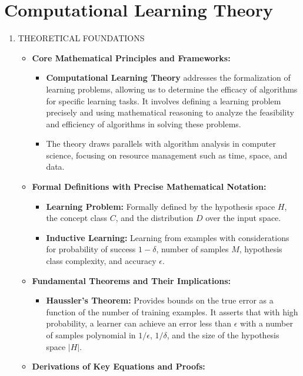 \documentclass[
  12pt,
]{report}
\providecommand{\tightlist}{%
  \setlength{\itemsep}{0pt}\setlength{\parskip}{0pt}}
\begin{document}
\chapter{Computational Learning Theory}

\begin{enumerate}
\def\labelenumi{\arabic{enumi}.}
\item
  THEORETICAL FOUNDATIONS

  \begin{itemize}
  \tightlist
  \item
    \textbf{Core Mathematical Principles and Frameworks:}

    \begin{itemize}
    \tightlist
    \item
      \textbf{Computational Learning Theory} addresses the formalization of learning problems, allowing us to determine the efficacy of algorithms for specific learning tasks. It involves defining a learning problem precisely and using mathematical reasoning to analyze the feasibility and efficiency of algorithms in solving these problems.
    \item
      The theory draws parallels with algorithm analysis in computer science, focusing on resource management such as time, space, and data.
    \end{itemize}
  \item
    \textbf{Formal Definitions with Precise Mathematical Notation:}

    \begin{itemize}
    \tightlist
    \item
      \textbf{Learning Problem:} Formally defined by the hypothesis space \(H\), the concept class \(C\), and the distribution \(D\) over the input space.
    \item
      \textbf{Inductive Learning:} Learning from examples with considerations for probability of success \(1 - \delta\), number of samples \(M\), hypothesis class complexity, and accuracy \(\epsilon\).
    \end{itemize}
  \item
    \textbf{Fundamental Theorems and Their Implications:}

    \begin{itemize}
    \tightlist
    \item
      \textbf{Haussler's Theorem:} Provides bounds on the true error as a function of the number of training examples. It asserts that with high probability, a learner can achieve an error less than \(\epsilon\) with a number of samples polynomial in \(1/\epsilon\), \(1/\delta\), and the size of the hypothesis space \(|H|\).
    \end{itemize}
  \item
    \textbf{Derivations of Key Equations and Proofs:}


\end{itemize}
\end{enumerate}
\end{document}
